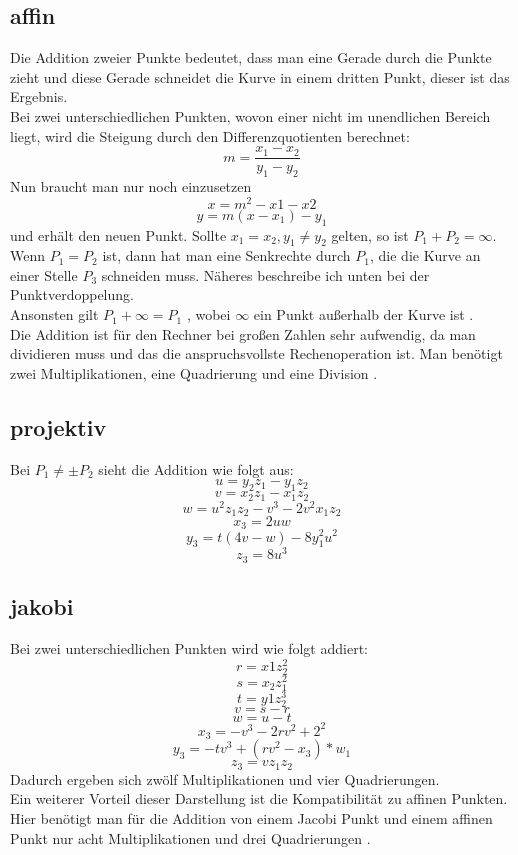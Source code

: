\subsection{affin}
Die Addition zweier Punkte bedeutet, dass man eine Gerade durch die Punkte zieht und diese Gerade schneidet die Kurve in einem dritten Punkt, dieser ist das Ergebnis.\\
Bei zwei unterschiedlichen Punkten, wovon einer nicht im unendlichen Bereich liegt, wird die Steigung durch den Differenzquotienten berechnet: \[m = \frac{x_1-x_2}{y_1 - y_2}\]
Nun braucht man nur noch einzusetzen \[x = m^2 -x1 - x2\] \[y = m(x-x_1)-y_1\] und erhält den neuen Punkt. Sollte \(x_1 = x_2 , y_1 \neq y_2\) gelten, so ist \(P_1 + P_2 = \infty\).\\
Wenn \(P_1 = P_2\) ist, dann hat man eine Senkrechte durch \(P_1\), die die Kurve an einer Stelle \(P_3\) schneiden muss. Näheres beschreibe ich unten bei der Punktverdoppelung.\\

Ansonsten gilt \(P_1 + \infty = P_1\) , wobei \(\infty\) ein Punkt außerhalb der Kurve ist \cite{Washington2003}.\\
Die Addition ist für den Rechner bei großen Zahlen sehr aufwendig, da man dividieren muss und das die anspruchsvollste Rechenoperation ist. Man benötigt zwei Multiplikationen, eine Quadrierung und eine Division \cite{Washington2003}.
\subsection{projektiv}
Bei \(P_1 \neq \pm P_2\) sieht die Addition wie folgt aus:
\[u = y_2z_1 - y_1z_2\] \[v = x_2z_1 - x_1z_2\] \[w = u^2z_1z_2 - v^3 -2v^2x_1z_2\] \[x_3 = 2uw\] \[y_3 = t(4v -w)-8y_1^2u^2\] \[z_3 = 8u^3\]
\subsection{jakobi}
Bei zwei unterschiedlichen Punkten wird wie folgt addiert:
\[r = x1z_2^2\] \[s = x_2z_1^2\] \[t = y1z_2^3\] \[v = s - r\] \[w = u - t\] \[x_3 = -v^3 - 2rv^2 + 2^2\] \[y_3 = -tv^3 + (rv^2-x_3)*w_1\] \[z_3 = vz_1z_2\]
Dadurch ergeben sich zwölf Multiplikationen und vier Quadrierungen.\\
Ein weiterer Vorteil dieser Darstellung ist die Kompatibilität zu affinen Punkten. Hier benötigt man für die Addition von einem Jacobi Punkt und einem affinen Punkt nur acht Multiplikationen und drei Quadrierungen \cite{Washington2003}.


